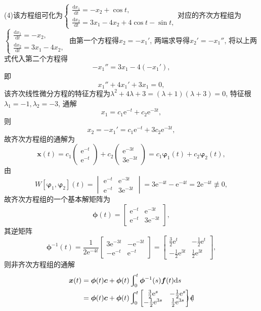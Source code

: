 \documentclass[12pt,UTF8]{ctexart}
\newcommand{\Int}[4]{\varint\nolimits_{#1}^{#2}#3\mathrm d#4}
\newcommand{\me}[0]{\mathrm e}
\newcommand{\dd}[2]{\frac{\mathrm d #1}{\mathrm d #2}}
\begin{document}
\begin{enumerate}
(4)该方程组可化为$\begin{cases}
\dd{x_1}t=-x_2+\cos t,\\
\dd{x_2}t=3x_1-4x_2+4\cos t-\sin t,
\end{cases}$对应的齐次方程组为$\begin{cases}
\dd{x_1}t=-x_2,\\
\dd{x_2}t=3x_1-4x_2,
\end{cases}$
由第一个方程得$x_2=-x_1'$, 两端求导得$x_2'=-x_1''$, 将以上两式代入第二个方程得\[-x_1''=3x_1-4(-x_1'),\]即
\[x_1''+4x_1'+3x_1=0,\]
该齐次线性微分方程的特征方程为$\lambda^2+4\lambda+3=(\lambda+1)(\lambda+3)=0$, 特征根$\lambda_1=-1,\lambda_2=-3$, 通解
\[x_1=c_1\me^{-t}+c_2\me^{-3t},\]
则\[
x_2=-x_1'=c_1\me^{-t}+3c_2\me^{-3t},
\]
故齐次方程组的通解为
\[\bm x(t)=c_1\begin{pmatrix}
\me^{-t}\\
\me^{-t}
\end{pmatrix}+c_2\begin{pmatrix}
\me^{-3t}\\
3\me^{-3t}
\end{pmatrix}=c_1\bm\varphi_1(t)+c_2\bm\varphi_2(t),\]
由
\[W[\bm\varphi_1,\bm\varphi_2](t)=\begin{vmatrix}\me^{-t}&\me^{-3t}\\\me^{-t}&3\me^{-3t}\end{vmatrix}=3\me^{-4t}-\me^{-4t}=2\me^{-4t}\not\equiv0,\]
故齐次方程组的一个基本解矩阵为
\[\bm\phi(t)=\begin{bmatrix}\me^{-t}&\me^{-3t}\\\me^{-t}&3\me^{-3t}\end{bmatrix},\]
其逆矩阵
\[
\bm\phi^{-1}(t)=\frac1{2\me^{-4t}}\begin{bmatrix}
3\me^{-3t}&-\me^{-3t}\\
-\me^{-t}&\me^{-t}
\end{bmatrix}=\begin{bmatrix}
\frac32\me^t&-\frac12\me^t\\
-\frac12\me^{3t}&\frac12\me^{3t}
\end{bmatrix},
\]
则非齐次方程组的通解
\[\begin{aligned}
\bm x(t)&=\bm\phi(t)\bm c+\bm\phi(t)\Int0t{\bm\phi^{-1}(s)\bm f(t)}s\\
&=\bm\phi(t)\bm c+\bm\phi(t)\Int0t{\begin{bmatrix}
\frac32\me^s&-\frac12\me^s\\
-\frac12\me^{3s}&\frac12\me^{3s}
\end{bmatrix}\begin{pmatrix}

\end{pmatrix}}
\end{aligned}\]
\end{enumerate}
\end{document}
